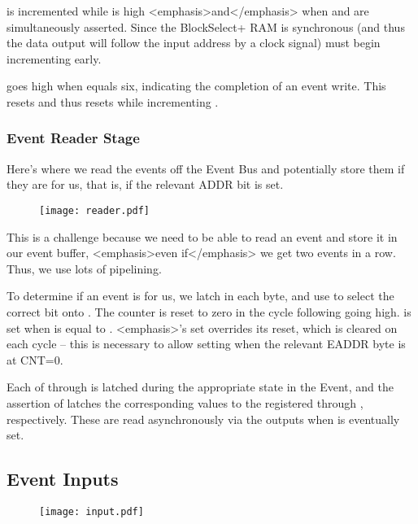  is incremented while 
is high <emphasis>and</emphasis> when  and
 are simultaneously asserted. Since the
BlockSelect+ RAM is synchronous (and thus the data output will follow
the input address by a clock signal)  must
begin incrementing early.

 goes high when  equals
six, indicating the completion of an event write. This resets
 and thus resets 
while incrementing .  
    

\subsubsection{Event Reader Stage}

Here's where we read the events off the Event Bus and potentially
store them if they are for us, that is, if the relevant ADDR bit is
set.


\begin{figure}
\texttt{[image: reader.pdf]}
\end{figure}
      
This is a challenge because we need to be able to read an event and
store it in our event buffer, <emphasis>even if</emphasis> we get two
events in a row. Thus, we use lots of pipelining.

To determine if an event is for us, we latch in each
 byte, and use 
to select the correct bit onto . The counter
 is reset to zero in the cycle following
 going high.  is set when
 is equal to .
<emphasis>'s set overrides its reset, which is
cleared on each cycle -- this is necessary to allow setting when the
relevant EADDR byte is at CNT=0. 

Each of  through  is
latched during the appropriate state in the Event, and the assertion
of  latches the corresponding values to the
registered  through
, respectively. These are read
asynchronously via the outputs when  is
eventually set.

\subsection{Event Inputs} 

\begin{figure}
\texttt{[image: input.pdf]}
\end{figure}

